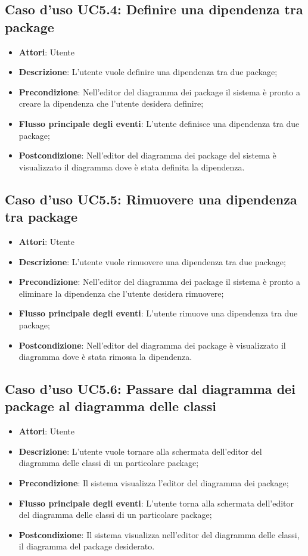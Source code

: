 \documentclass[../AnalisiDeiRequisiti.tex]{subfiles}
\begin{document}
			\subsection{Caso d'uso UC5.4: Definire una dipendenza tra package}
			\begin{itemize}
				\item \textbf{Attori}: Utente
				\item \textbf{Descrizione}: L'utente vuole definire una dipendenza tra due package;
				\item \textbf{Precondizione}: Nell'editor del diagramma dei package il sistema è pronto a creare la dipendenza che l'utente desidera definire;
				\item \textbf{Flusso principale degli eventi}: L'utente definisce una dipendenza tra due package;
				\item \textbf{Postcondizione}: Nell'editor del diagramma dei package del sistema è visualizzato il diagramma dove è stata definita la dipendenza.
			\end{itemize}
			\subsection{Caso d'uso UC5.5: Rimuovere una dipendenza tra package}
			\begin{itemize}
				\item \textbf{Attori}: Utente
				\item \textbf{Descrizione}: L'utente vuole rimuovere una dipendenza tra due package;
				\item \textbf{Precondizione}: Nell'editor del diagramma dei package il sistema è pronto a eliminare la dipendenza che l'utente desidera rimuovere;
				\item \textbf{Flusso principale degli eventi}: L'utente rimuove una dipendenza tra due package;
				\item \textbf{Postcondizione}: Nell'editor del diagramma dei package è visualizzato il diagramma dove è stata rimossa la dipendenza.
			\end{itemize}
			\subsection{Caso d'uso UC5.6: Passare dal diagramma dei package al diagramma delle classi}
			\begin{itemize}
				\item \textbf{Attori}: Utente
				\item \textbf{Descrizione}: L'utente vuole tornare alla schermata dell'editor del diagramma delle classi di un particolare package;
				\item \textbf{Precondizione}: Il sistema visualizza l'editor del diagramma dei package;
				\item \textbf{Flusso principale degli eventi}: L'utente torna alla schermata dell'editor del diagramma delle classi di un particolare package;
				\item \textbf{Postcondizione}: Il sistema visualizza nell'editor del diagramma delle classi, il diagramma del package desiderato.
			\end{itemize}
\end{document}
